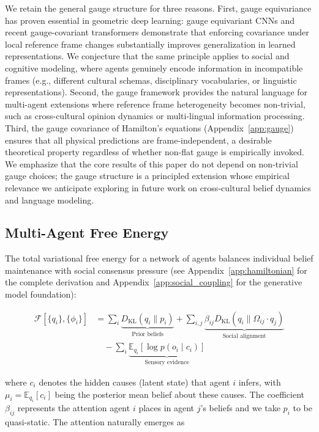 \documentclass[12pt]{article}
\begin{document}
We retain the general gauge structure for three reasons. First, gauge equivariance has proven essential in geometric deep learning: gauge equivariant CNNs \citep{cohen2019gauge} and recent gauge-covariant transformers \citep{he2025cask} demonstrate that enforcing covariance under local reference frame changes substantially improves generalization in learned representations. We conjecture that the same principle applies to social and cognitive modeling, where agents genuinely encode information in incompatible frames (e.g., different cultural schemas, disciplinary vocabularies, or linguistic representations). Second, the gauge framework provides the natural language for multi-agent extensions where reference frame heterogeneity becomes non-trivial, such as cross-cultural opinion dynamics or multi-lingual information processing. Third, the gauge covariance of Hamilton's equations (Appendix~\ref{app:gauge}) ensures that all physical predictions are frame-independent, a desirable theoretical property regardless of whether non-flat gauge is empirically invoked. We emphasize that the core results of this paper do not depend on non-trivial gauge choices; the gauge structure is a principled extension whose empirical relevance we anticipate exploring in future work on cross-cultural belief dynamics and language modeling.

\subsection{Multi-Agent Free Energy}

The total variational free energy for a network of agents balances individual belief maintenance with social consensus pressure (see Appendix~\ref{app:hamiltonian} for the complete derivation and Appendix~\ref{app:social_coupling} for the generative model foundation):

\begin{align}
\mathcal{F}[\{q_i\}, \{\phi_i\}] &= \sum_i \underbrace{D_{\mathrm{KL}}(q_i \| p_i)}_{\text{Prior beliefs}} + \sum_{i,j} \underbrace{\beta_{ij} D_{\mathrm{KL}}(q_i \| \Omega_{ij} \cdot q_j)}_{\text{Social alignment}} \\
&\quad - \sum_i \underbrace{\mathbb{E}_{q_i}[\log p(o_i \mid c_i)]}_{\text{Sensory evidence}}
\end{align}

where $c_i$ denotes the hidden causes (latent state) that agent $i$ infers, with $\mu_i = \mathbb{E}_{q_i}[c_i]$ being the posterior mean belief about these causes. The coefficient $\beta_{ij}$ represents the attention agent $i$ places in agent $j$'s beliefs and we take $p_i$ to be quasi-static. The attention naturally emerges as
\end{document}
